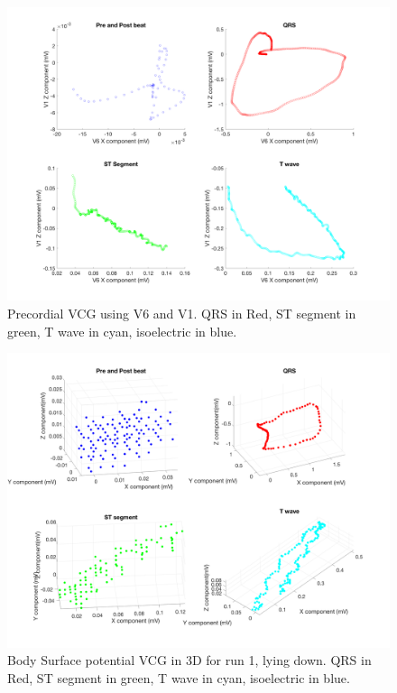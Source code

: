 \documentclass[12pt]{article}
\begin{document}
\begin{figure}[H]
	
	\centering
	\includegraphics[width = .95\textwidth]{Figures/Precordial_V1V6.png}
	\caption{Precordial VCG using V6 and V1. QRS in Red, ST segment in green, T wave in cyan, isoelectric in blue.}
	\label{fig:PrecordVect}
\end{figure}

\begin{figure}[H]
	
	\centering
	\includegraphics[width = .95\textwidth]{Figures/BSP_run1_3d.png}
	\caption{Body Surface potential VCG in 3D for run 1, lying down. QRS in Red, ST segment in green, T wave in cyan, isoelectric in blue.}
	\label{fig:BSP1}
\end{figure}
\end{document}
